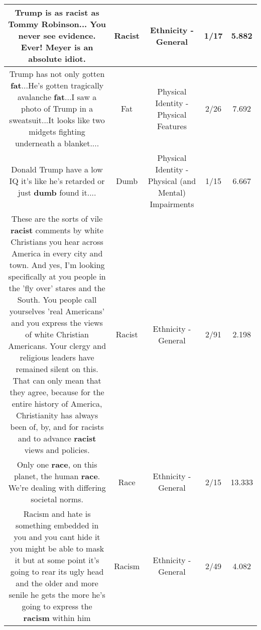 \documentclass[11pt]{article}
\newlength\mylength
\begin{document}
\begin{center}
\begin{longtable}{|C{.65\mylength}|C{.30\mylength}|C{.12\mylength}|C{.12\mylength}|C{.12\mylength}|}
  \small Trump is as \textbf{racist} as Tommy Robinson...  You never see evidence. Ever! Meyer is an absolute idiot.\normalsize   & Racist & Ethnicity - General & 1/17 & 5.882 \\  \hline
  \small Trump has not only gotten \textbf{fat}...He's gotten tragically avalanche \textbf{fat}...I saw a photo of Trump in a sweatsuit...It looks like two midgets fighting underneath a blanket....\normalsize   & Fat & Physical Identity - Physical Features & 2/26 & 7.692 \\  \hline
  \small Donald Trump have a low IQ it's like he's retarded or just \textbf{dumb} found it....\normalsize   & Dumb & Physical Identity - Physical (and Mental) Impairments & 1/15 & 6.667 \\  \hline
  \small These are the sorts of vile \textbf{racist} comments by white Christians you hear across America in every city and town. And yes, I'm looking specifically at you people in the 'fly over' stares and the South. You people call yourselves 'real Americans' and you express the views of white Christian Americans. Your clergy and religious leaders have remained silent on this. That can only mean that they agree, because for the entire history of America, Christianity has always been of, by, and for racists and to advance \textbf{racist} views and policies.\normalsize   & Racist & Ethnicity - General & 2/91 & 2.198 \\  \hline
  \small Only one \textbf{race}, on this planet, the human \textbf{race}. We're dealing with differing societal norms.\normalsize   & Race & Ethnicity - General & 2/15 & 13.333 \\  \hline
  \small Racism and hate is something embedded in you and you cant hide it you might be able to mask it but at some point it's going to rear its ugly head and the older and more senile he gets the more he's going to express the \textbf{racism} within him\normalsize   & Racism & Ethnicity - General & 2/49 & 4.082 \\  \hline

\end{longtable}
\end{center}
\end{document}
